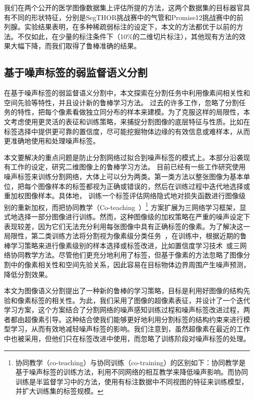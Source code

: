 我们在两个公开的医学图像数据集上评估所提的方法，这两个数据集的目标器官具有不同的形状特征，分别是SegTHOR挑战赛\citep{trullo2019multiorgan}中的气管和Promise12挑战赛\citep{Litjens2014EvaluationOP}中的前列腺。实验结果表明，在多种稀疏弱标注的设定下，本文的方法都优于以前的方法。不仅如此，在少量的标注条件下（10\%的二维切片标注），其他现有方法的效果大幅下降，而我们取得了鲁棒准确的结果。

\subsection{基于噪声标签的弱监督语义分割}
在基于噪声标签的弱监督语义分割中，本文探索在分割任务中利用像素间相关性和空间先验等特性，并且设计新的鲁棒学习方法。
过去的许多工作，忽略了分割任务的特性，把每个像素看做独立同分布的样本来建模。为了克服这样的局限性，本文考虑使用更灵活的表征和训练策略，来捕捉分割图像的底层特征与性质。比如在标签选择中提供更可靠的置信度，尽可能挖掘物体边缘的有效信息或难样本，从而更准确地使用和处理噪声标签。

本文要解决的重点问题是防止分割网络过拟合到噪声标签的模式上。本部分沿袭现有工作的设定，研究二维图像上的鲁棒学习方法。
目前已经有一些工作研究使用噪声标签来训练分割网络，大体上可以分为两类。第一类方法以整张图像为基本单位，把每个图像样本的标签都视为正确或错误的，然后在训练过程中迭代地选择或重加权图像样本\citep{Zhu2019PickandLearnAQ,Xue2020CascadedRL}。具体地，\citet{Zhu2019PickandLearnAQ} 训练一个标签评估网络隐式地对损失函数进行图像级别的重新加权，而\citet{Xue2020CascadedRL}把协同教学（Co-teaching~\cite{Han2018CoteachingRT}）\footnote{协同教学（co-teaching）与协同训练（co-training）的区别如下：协同教学是基于噪声标签的训练方法，利用不同网络的相互教学来降低噪声影响。而协同训练是半监督学习中的方法，使用有标注数据中不同视图的特征来训练模型，并扩大训练集的标签规模。} 方案扩展为三网络学习框架，显式地选择一部分图像进行训练。然而，这种图像级的加权策略在严重的噪声设定下表现较差，因为它们无法充分利用每张图像中具有正确标签的像素。为了解决这一局限性，第二类训练方法将分割视为像素级分类任务~\citep{Zhang2020CharacterizingLE,Zhang2020RobustMI}，在训练中，根据近期的鲁棒学习策略来进行像素级别的样本选择或标签改进，比如置信度学习技术~\citep{Zhang2020CharacterizingLE}或三网络协同教学方法\citep{Zhang2020RobustMI}。尽管他们更充分地利用了标签，但基于像素的方法忽略了图像分割中的像素相关性和空间先验关系，因此容易在目标物体边界周围产生噪声预测，降低分割效果。

本文为图像语义分割提出了一种新的鲁棒的学习策略，目标是利用好图像的结构先验和像素标签的相关性。为此，我们采用了图像的超像素表征，并设计了一个迭代学习方案，这个方案结合了分割网络的噪声感知训练过程和噪声标签改进过程，两者都由超像素引导。这种结合使我们能够更好地利用分割标签的结构约束来进行模型学习，从而有效地减轻噪声标签的影响。我们注意到，虽然超像素在最近的工作中也被采用\citep{li2019supervised}，但他们只在标签改进中使用，而忽略了训练阶段对噪声标签的处理。

